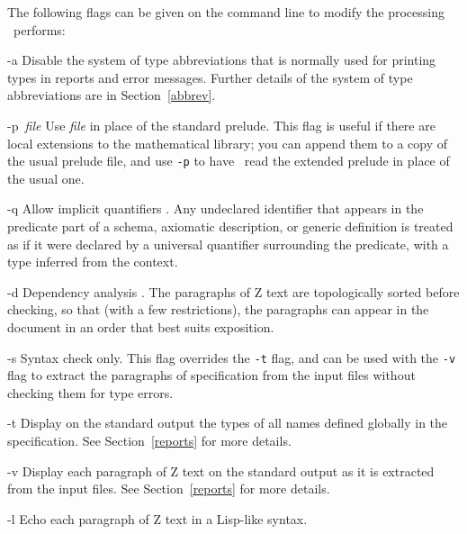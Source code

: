 The following flags can be given on the command line to modify the
processing \fuzz\ performs:
\begin{list}{}{\def\makelabel#1{\tt #1\hfil}}
\item[-a] Disable the system of type
        abbreviations
        that is normally used for printing types in reports and error
        messages.  Further details of the system of type
        abbreviations are in Section~\ref{abbrev}.

\item[-p{\it\ file\/}] Use {\it file\/} in place of
        the standard prelude.  This flag is
        useful if there are local extensions to the mathematical
        library; you can append them to a copy of the usual prelude
        file, and use \verb/-p/ to have \fuzz\ read the extended
        prelude in place of the usual one.

\item[-q] Allow implicit quantifiers%
        .  Any undeclared identifier that
        appears in the 
        predicate part of a schema, axiomatic description, or
        generic definition is treated as if it were declared by a
        universal quantifier surrounding the predicate, with a type
        inferred from the context.

\item[-d] Dependency analysis%
	.  The paragraphs of Z text are
	topologically sorted before checking, so that (with a few
	restrictions), the paragraphs can appear in the document in
	an order that best suits exposition.

\item[-s] Syntax check only. This flag overrides
        the \verb/-t/ flag, and can be used with the \verb/-v/ flag
        to extract the paragraphs of specification from the input
        files without checking them for type errors.

\item[-t] Display on the standard
        output the types of all names defined globally in the
        specification.  See Section~\ref{reports} for more details.

\item[-v] Display each paragraph of Z text on the
        standard output as it is extracted from the input files. See
        Section~\ref{reports} for more details.

\item[-l] Echo each paragraph of Z text in a
 	Lisp-like syntax.
\end{list}

